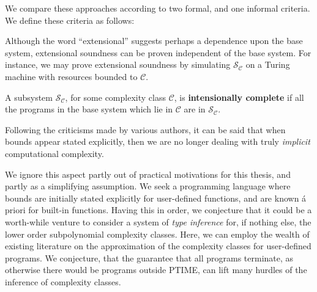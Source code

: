 We compare these approaches according to two formal, and one informal criteria.
We define these criteria as follows:


Although the word ``extensional'' suggests perhaps a dependence upon the base
system, extensional soundness can be proven independent of the base system.
For instance, we may prove extensional soundness by simulating $\mathcal{S_C}$
on a Turing machine with resources bounded to $\mathcal{C}$.

\begin{definition} A subsystem $\mathcal{S_C}$, for some complexity class
$\mathcal{C}$, is \textbf{intensionally complete} if all the programs in the
base system which lie in $\mathcal{C}$ are in $\mathcal{S_C}$. \end{definition}




Following the criticisms made by various
authors\cite{hofmann-2000,dal-lago-hofmann-2010}, it can be said that when
bounds appear stated explicitly, then we are no longer dealing with truly
\emph{implicit} computational complexity.

We ignore this aspect partly out of practical motivations for this thesis, and
partly as a simplifying assumption. We seek a programming language where bounds
are initially stated explicitly for user-defined functions, and are known á
priori for built-in functions. Having this in order, we conjecture that it
could be a worth-while venture to consider a system of \emph{type inference}
for, if nothing else, the lower order subpolynomial complexity classes. Here,
we can employ the wealth of existing literature on the approximation of the
complexity classes for user-defined programs. We conjecture, that the guarantee
that all programs terminate, as otherwise there would be programs outside
PTIME, can lift many hurdles of the inference of complexity classes.




